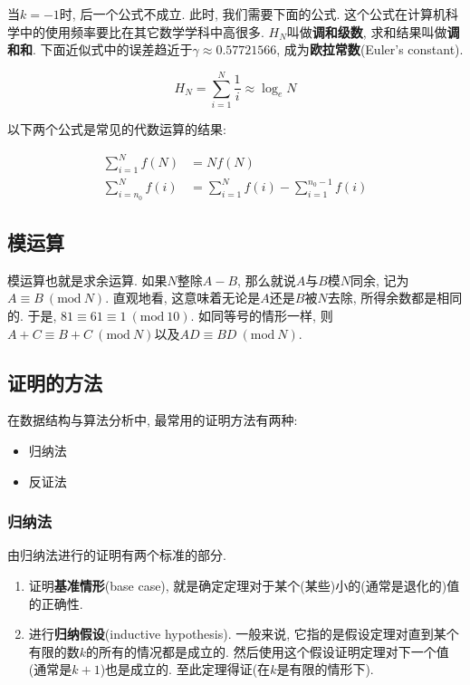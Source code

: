 \documentclass[oneside]{ctexbook}
\begin{document}
当$k=-1$时, 后一个公式不成立. 此时, 我们需要下面的公式. 这个公式在计算机科学中的使用频率要比在其它数学学科中高很多. $H_N$叫做\textbf{调和级数}, 求和结果叫做\textbf{调和和}. 下面近似式中的误差趋近于$\gamma\approx 0.57721566$, 成为\textbf{欧拉常数}(Euler's constant).

\begin{equation*}
    H_N=\sum_{i=1}^{N}\frac{1}{i}\approx\log_eN
\end{equation*}

以下两个公式是常见的代数运算的结果:

\begin{equation*}
    \begin{split}
        \sum_{i=1}^{N}f(N) &= Nf(N) \\
        \sum_{i=n_0}^{N}f(i) &= \sum_{i=1}^{N}f(i) - \sum_{i=1}^{n_0-1}f(i)
    \end{split}
\end{equation*}

\subsection{模运算}

\newcommand{\Mod}[1]{\ (\mathrm{mod}\ #1)}

模运算也就是求余运算. 如果$N$整除$A-B$, 那么就说$A$与$B$模$N$同余, 记为$A\equiv B\Mod{N}$. 直观地看, 这意味着无论是$A$还是$B$被$N$去除, 所得余数都是相同的. 于是, $81\equiv 61\equiv 1\Mod{10}$. 如同等号的情形一样, 则$A+C\equiv B+C\Mod{N}$以及$AD\equiv BD\Mod{N}$.

\subsection{证明的方法}\label{证明的方法}

在数据结构与算法分析中, 最常用的证明方法有两种:

\begin{itemize}
    \item 归纳法
    \item 反证法
\end{itemize}

\subsubsection{归纳法}

由归纳法进行的证明有两个标准的部分.

\begin{enumerate}
    \item 证明\textbf{基准情形}(base case), 就是确定定理对于某个(某些)小的(通常是退化的)值的正确性.
    \item 进行\textbf{归纳假设}(inductive hypothesis). 一般来说, 它指的是假设定理对直到某个有限的数$k$的所有的情况都是成立的. 然后使用这个假设证明定理对下一个值(通常是$k+1$)也是成立的. 至此定理得证(在$k$是有限的情形下).
\end{enumerate}
\end{document}
